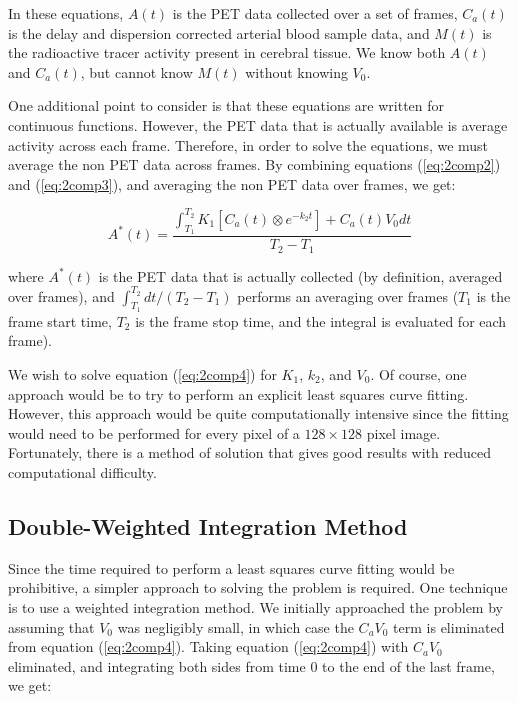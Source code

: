 In these equations, $A(t)$ is the PET data collected over a set of
frames, $C_{a}(t)$ is the delay and dispersion corrected arterial
blood sample data, and $M(t)$ is the radioactive tracer activity
present in cerebral tissue.  We know both $A(t)$ and $C_{a}(t)$, but
cannot know $M(t)$ without knowing $V_{0}$.

One additional point to consider is that these equations are written
for continuous functions.  However, the PET data that is actually
available is average activity across each frame.  Therefore, in
order to solve the equations, we must average the non PET data
across frames.  By combining equations (\ref{eq:2comp2}) and
(\ref{eq:2comp3}), and averaging the non PET data over frames, we
get:

\begin{equation}
A^{*}(t) = \frac{\int_{T_1}^{T_2} K_{1} \left[ C_{a}(t) \otimes
e^{-k_{2}t} \right] + C_{a}(t)V_{0} dt}{T_{2} - T_{1}}
\label{eq:2comp4}
\end{equation}

where $A^{*}(t)$ is the PET data that is actually collected (by
definition, averaged over frames), and ${\int_{T_1}^{T_2}dt} / {(T_2 -
T_1)}$ performs an averaging over frames ($T_1$ is the frame start
time, $T_2$ is the frame stop time, and the integral is evaluated for
each frame).

We wish to solve equation (\ref{eq:2comp4}) for $K_{1}$, $k_{2}$, and
$V_{0}$.  Of course, one approach would be to try to perform an
explicit least squares curve fitting.  However, this approach would be
quite computationally intensive since the fitting would need to be
performed for every pixel of a $128 \times 128$ pixel image.  Fortunately,
there is a method of solution that gives good results with reduced
computational difficulty.

\subsection{Double-Weighted Integration Method}

\label{sec:double_weight}

Since the time required to perform a least squares curve fitting would
be prohibitive, a simpler approach to solving the problem is required.
One technique is to use a weighted integration method.  We initially
approached the problem by assuming that $V_{0}$ was negligibly small,
in which case the $C_{a}V_{0}$ term is eliminated from equation
(\ref{eq:2comp4}).  Taking equation (\ref{eq:2comp4}) with $C_{a}V_0$
eliminated, and integrating both sides from time 0 to the end of the
last frame, we get:

